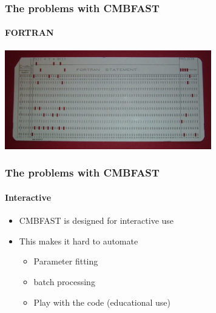 \documentclass{beamer}
\begin{document}
	\begin{frame}
		\frametitle{The problems with CMBFAST}
		\framesubtitle{FORTRAN}
		\begin{center}
			\includegraphics[width=90mm]{punch_card.jpg}
		\end{center}
	\end{frame}
	
	\begin{frame}
		\frametitle{The problems with CMBFAST}
		\framesubtitle{Interactive}
		\begin{itemize}
			\item CMBFAST is designed for interactive use
			\item This makes it hard to automate
				\begin{itemize}
					\item Parameter fitting
					\item batch processing
					\item Play with the code (educational use)
				\end{itemize}
		\end{itemize}
	\end{frame}
	
\end{document}
